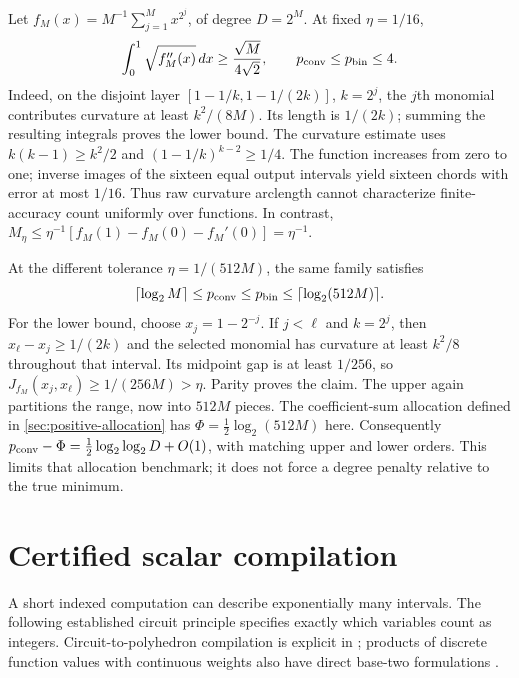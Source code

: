 \begin{example}
\label{ex:positive-degree-gap}
Let $f_M(x)=M^{-1}\sum_{j=1}^M x^{2^j}$, of degree $D=2^M$.
At fixed $\eta=1/16$,
\begin{equation}\label{eq:raw-curvature-obstruction}
 \int_0^1\sqrt{f_M''(x)}\,dx\ge\frac{\sqrt M}{4\sqrt2},
 \qquad p_{\mathrm{conv}}\le p_{\mathrm{bin}}\le4.
\end{equation}
Indeed, on the disjoint layer
$[1-1/k,1-1/(2k)]$, $k=2^j$, the $j$th monomial contributes curvature
at least $k^2/(8M)$. Its length is $1/(2k)$; summing the resulting
integrals proves the lower bound. The curvature estimate uses
$k(k-1)\ge k^2/2$ and $(1-1/k)^{k-2}\ge1/4$.
The function increases from zero to one; inverse images of the sixteen
equal output intervals yield sixteen chords with error at most $1/16$.
Thus raw curvature arclength cannot characterize finite-accuracy count
uniformly over functions. In contrast,
$M_\eta\le\eta^{-1}[f_M(1)-f_M(0)-f_M'(0)]=\eta^{-1}$.

At the different tolerance $\eta=1/(512M)$, the same family satisfies
\begin{equation}\label{eq:degree-allocation-obstruction}
 \lceil\log_2M\rceil\le p_{\mathrm{conv}}\le p_{\mathrm{bin}}
 \le\lceil\log_2(512M)\rceil.
\end{equation}
For the lower bound, choose $x_j=1-2^{-j}$. If $j<\ell$ and $k=2^j$,
then $x_\ell-x_j\ge1/(2k)$ and the selected monomial has curvature
at least $k^2/8$ throughout that interval. Its midpoint gap is at least
$1/256$, so $J_{f_M}(x_j,x_\ell)\ge1/(256M)>\eta$. Parity proves
the claim. The upper again partitions the range, now into $512M$ pieces.
The coefficient-sum allocation defined in \cref{sec:positive-allocation}
has $\Phi=\frac12\log_2(512M)$ here. Consequently
$p_{\mathrm{conv}}-\Phi=\frac12\log_2\log_2D+O(1)$, with matching upper
and lower orders. This limits that allocation benchmark; it does not
force a degree penalty relative to the true minimum.
\end{example}

\section{Certified scalar compilation}\label{sec:scalar-compilation}

A short indexed computation can describe exponentially many intervals.
The following established circuit principle specifies exactly which
variables count as integers. Circuit-to-polyhedron compilation is explicit
in \citet[Section 3, Lemma 1]{avis2019}; products of discrete function
values with continuous weights also have direct base-two formulations
\citep[Section 2]{adams2012}.

